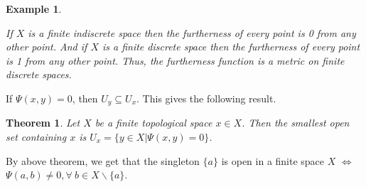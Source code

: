 \documentclass[12pt]{amsart}
\newtheorem{example}[definition]{Example}
\newtheorem{theorem}[definition]{Theorem}
\begin{document}
\begin{example}\label{2.7}
	{\normalfont
		If $X$ is a finite indiscrete space then the furtherness of every point is 0 from any other point. And if $X$ is a finite discrete space then the furtherness of every point is 1 from any other point. Thus, the furtherness function is a metric on finite discrete spaces.
		
	}
	
	
	
	
	
\end{example}

If $\Psi(x,y)=0$, then $U_y\subseteq U_x$. This gives the following result.

\begin{theorem}\label{2}
	Let $X$ be a finite topological space $x\in X$. Then the smallest open set containing $x$ is $U_x=\{y\in X |\Psi(x,y)=0\}$. %
\end{theorem}
By above theorem, we get that the singleton $\{a\}$ is open in a finite space $X$ $\iff$ $\Psi(a,b)\neq0,\forall~ b\in X\backslash\{a\}$.
\end{document}
